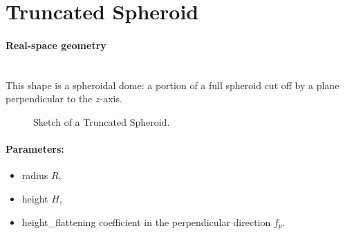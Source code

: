 \newpage%

\section{Truncated Spheroid} 

\paragraph{Real-space geometry}\mbox{}\\
This shape is a spheroidal dome: a portion of a full spheroid cut off
by a plane perpendicular to the $z$-axis.

\begin{figure}[ht]
\hfill
{}
\hfill
{}
\hfill
\caption{Sketch of a Truncated Spheroid.}
\label{fig:spheroid}
\end{figure}

\paragraph{Parameters:}
\begin{itemize}
\item radius $R$,
\item height $H$,
\item height\_flattening coefficient in the perpendicular direction $f_p$.
\end{itemize}


